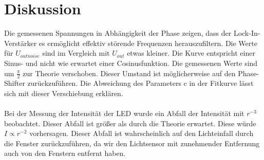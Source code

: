 \section{Diskussion}
\label{sec:Diskussion}

Die gemessenen Spannungen in Abhängigkeit der Phase zeigen, dass der Lock-In-Verstärker es ermöglicht effektiv 
störende Frequenzen herauszufiltern. Die Werte für $U_{outnoise}$ sind im Vergleich mit $U_{out}$ etwas kleiner.
Die Kurve entspricht einer Sinus- und nicht wie erwartet einer Cosinusfunktion. Die gemessenen Werte sind um 
$\frac{\pi}{2}$ zur Theorie verschoben. Dieser Umstand ist möglicherweise auf den Phase-Shifter zurückzuführen.
Die Abweichung des Parameters c in der Fitkurve lässt sich mit dieser Verschiebung erklären.\\
\\
Bei der Messung der Intensität der LED wurde ein Abfall der Intensität mit $r^{-3}$ beobachtet. Dieser Abfall ist 
größer als durch die Theorie erwartet. Diese würde $I \propto r^{-2}$ vorhersagen. Dieser Abfall ist wahrscheinlich auf den Lichteinfall 
durch die Fenster zurückzuführen, da wir den Lichtsensor mit zunehmender Entfernung auch von den Fenstern entfernt haben.\\

